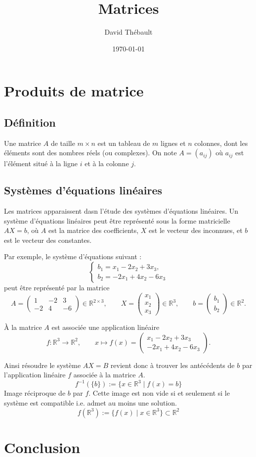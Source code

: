 \documentclass{article}
\title{Matrices}
\author{David Thébault}
\date{\today}
\begin{document}
\maketitle

\section{Produits de matrice}
\subsection{Définition}
Une matrice $A$ de taille $m\times n$ est un tableau de $m$ lignes et $n$ colonnes, dont les éléments sont des nombres réels (ou complexes). On note $A = (a_{ij})$ où $a_{ij}$ est l'élément situé à la ligne $i$ et à la colonne $j$.
\subsection{Systèmes d'équations linéaires}
Les matrices apparaissent dasn l'étude des systèmes d'équations linéaires. Un système d'équations linéaires peut être représenté sous la forme matricielle $AX = b$, où $A$ est la matrice des coefficients, $X$ est le vecteur des inconnues, et $b$ est le vecteur des constantes.

Par exemple, le système d'équations suivant :
\[
\begin{cases}
b_1 = x_1 - 2x_2 + 3x_3, \\
b_2 = -2x_1 + 4x_2 - 6x_3
\end{cases}
\]
peut être représenté par la matrice 
\[
A = \begin{pmatrix}1 & -2 & 3 \\ -2 & 4 & -6\end{pmatrix} \in \mathbb{R}^{2\times 3}, \qquad 
X = \begin{pmatrix}x_1 \\ x_2 \\ x_3\end{pmatrix} \in \mathbb{R}^{3}, \qquad
b = \begin{pmatrix}b_1 \\ b_2\end{pmatrix} \in \mathbb{R}^{2}.
\]

À la matrice $A$ est associée une application linéaire 
\[
f : \mathbb{R}^3 \to \mathbb{R}^2, \qquad 
x \mapsto f(x) = 
\begin{pmatrix}
x_1 - 2x_2 + 3x_3 \\
-2x_1 + 4x_2 - 6x_3
\end{pmatrix}.
\]

Ainsi résoudre le système $AX = B$ revient donc à trouver les antécédents de $b$ par l'application linéaire $f$ associée à la matrice $A$.
\[
f^{-1}(\{b\}) := \{x \in \mathbb{R}^3 \mid f(x) = b\}
\]
Image réciproque de $b$ par $f$. Cette image est non vide si et seulement si le système est compatible i.e. admet au moins une solution.
\[
f(\mathbb{R}^3) := \{f(x) \mid x \in \mathbb{R}^3\} \subset \mathbb{R}^2
\]
\section{Conclusion}
\end{document}
